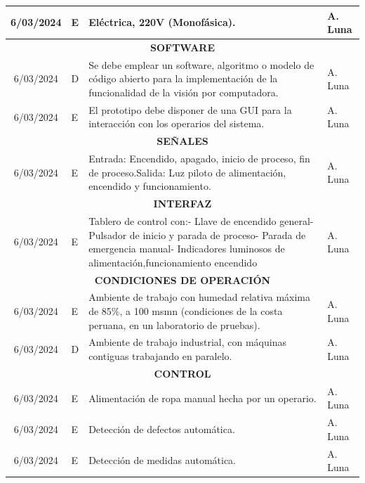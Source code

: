 \begin{longtable}{|c|p{4.5em}|p{22.5em}|p{6em}|}
	\hline
	6/03/2024 & E     & Eléctrica, 220V (Monofásica). & A. Luna \bigstrut\\
	\hline
	\multicolumn{4}{|p{37.5em}|}{\textbf{SOFTWARE}} \bigstrut\\
	\hline
	6/03/2024 & D     & Se debe emplear un software, algoritmo o modelo de código abierto para la implementación de la funcionalidad de la visión por computadora. & A. Luna \bigstrut\\
	\hline
	6/03/2024 & E     & El prototipo debe disponer de una GUI para la interacción con los operarios del sistema.  & A. Luna \bigstrut\\
	\hline
	\multicolumn{4}{|p{37.5em}|}{\textbf{SEÑALES}} \bigstrut\\
	\hline
	6/03/2024 & E     & Entrada: Encendido, apagado, inicio de proceso, fin de proceso.\newline{}Salida: Luz piloto de alimentación, encendido y funcionamiento. & A. Luna \bigstrut\\
	\hline
	\multicolumn{4}{|p{37.5em}|}{\textbf{INTERFAZ}} \bigstrut\\
	\hline
	6/03/2024 & E     & Tablero de control con:\newline{}- Llave de encendido general\newline{}- Pulsador de inicio y parada de proceso\newline{}- Parada de emergencia manual\newline{}- Indicadores luminosos de alimentación,funcionamiento encendido & A. Luna \bigstrut\\
	\hline
	\multicolumn{4}{|p{37.5em}|}{\textbf{CONDICIONES DE OPERACIÓN}} \bigstrut\\
	\hline
	6/03/2024 & E     & Ambiente de trabajo con humedad relativa máxima de 85\%, a 100 msmn (condiciones de la costa peruana, en un laboratorio de pruebas). & A. Luna \bigstrut\\
	\hline
	6/03/2024 & D     & Ambiente de trabajo industrial, con máquinas contiguas trabajando en paralelo. & A. Luna \bigstrut\\
	\hline
	\multicolumn{4}{|p{37.5em}|}{\textbf{CONTROL}} \bigstrut\\
	\hline
	6/03/2024 & E     & Alimentación de ropa manual hecha por un operario. & A. Luna \bigstrut\\
	\hline
	6/03/2024 & E     & Detección de defectos automática. & A. Luna \bigstrut\\
	\hline
	6/03/2024 & E     & Detección de medidas automática. & A. Luna \bigstrut\\

\end{longtable}
